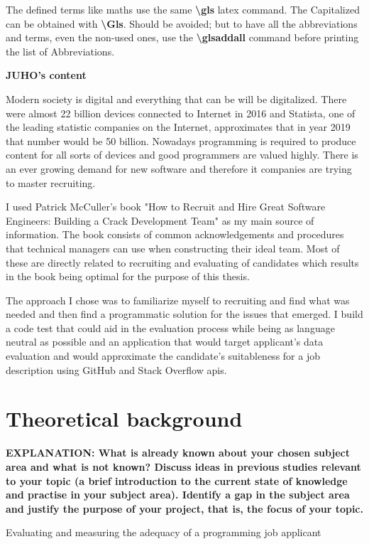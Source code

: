 \documentclass[11pt,a4paper,oneside,article]{memoir}
\begin{document}
The defined terms like \gls{maths} use the same \textbf{\textbackslash{}gls} \gls{latex} command. The Capitalized can be obtained with \textbf{\textbackslash{}Gls}. Should be avoided; but to have all the abbreviations and terms, even the non-used ones, use the \textbf{\textbackslash{}glsaddall} command before printing the list of Abbreviations. 

\textbf{JUHO's content}

Modern society is digital and everything that can be will be digitalized. There were almost 22 billion devices connected to Internet in 2016 and Statista, one of the leading statistic companies on the Internet, approximates that in year 2019 that number would be 50 billion. \cite{statista:numberof} Nowadays programming is required to produce content for all sorts of devices and good programmers are valued highly. There is an ever growing demand for new software and therefore \gls{it} companies are trying to master recruiting.

I used Patrick McCuller's book "How to Recruit and Hire Great Software Engineers: Building a Crack Development Team" \cite{mcculler:book} as my main source of information. The book consists of common acknowledgements and procedures that technical managers can use when constructing their ideal team. Most of these are directly related to recruiting and evaluating of candidates which results in the book being optimal for the purpose of this thesis.

The approach I chose was to familiarize myself to recruiting and find what was needed and then find a programmatic solution for the issues that emerged. I build a code test that could aid in the evaluation process while being as language neutral as possible and an application that would target applicant's data evaluation and would approximate the candidate's suitableness for a job description using GitHub and Stack Overflow \gls{api}s.

\chapter{Theoretical background}
\textbf{EXPLANATION: What is already known about your chosen subject area and what is not known? Discuss ideas in previous studies relevant to your topic (a brief introduction to the current state of knowledge and practise in your subject area). Identify a gap in the subject area and justify the purpose of your project, that is, the focus of your topic.}

Evaluating and measuring the adequacy of a programming job applicant
\end{document}

